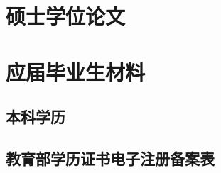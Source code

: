 \documentclass[UFT8]{ctexart}
\begin{document}
\clearpage
\section{硕士学位论文}

\clearpage
\section{应届毕业生材料}
\subsection{本科学历}



\subsection{教育部学历证书电子注册备案表}
\end{document}
